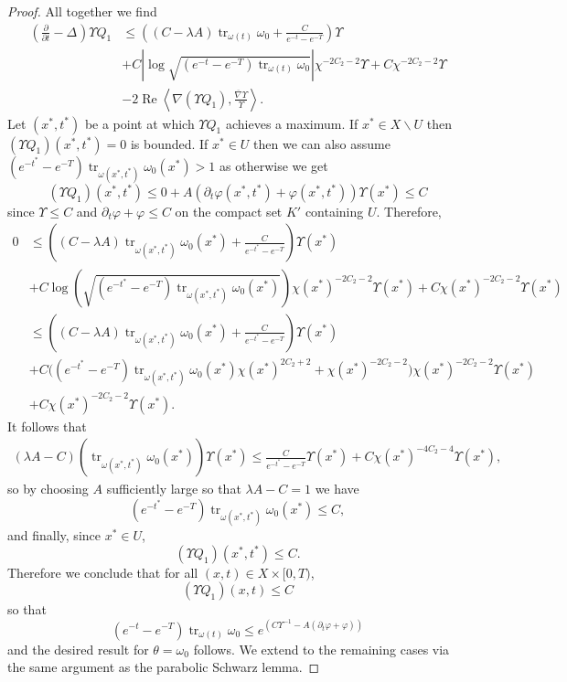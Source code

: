 \documentclass[12pt]{article}
\numberwithin{equation}{section}
\renewcommand{\d}{\partial}
\DeclareMathOperator{\tr}{tr}
\DeclareMathOperator{\Real}{Re}
\newcommand{\oo}[1]{\overline{#1}}
\newcommand{\parabolic}[1]{\left(\frac{\d}{\d t} - \Delta_{#1}\right)}
\newcommand{\ip}[1]{\left\langle#1\right\rangle}
\begin{document}
\begin{proof}
All together we find
\begin{align*}
    \parabolic{} \Upsilon Q_1 &\leq \left((C - \lambda A)\tr_{\omega(t)} \omega_0 + \frac{C}{e^{-t}-e^{-T}}\right) \Upsilon\\
    &+C \left|\log \sqrt{(e^{-t}-e^{-T})\tr_{\omega(t)} \omega_0} \right| \chi^{-2C_2-2}\Upsilon + C \chi^{-2C_2-2}\Upsilon\\
    &- 2 \Real \ip{\nabla (\Upsilon Q_1), \frac{\oo{\nabla} \Upsilon}{\Upsilon}}.
\end{align*}
Let $(x^*,t^*)$ be a point at which $\Upsilon Q_1$ achieves a maximum. If $x^* \in X \backslash U$ then $(\Upsilon Q_1)(x^*,t^*) =  0$ is bounded. If $x^* \in U$ then we can also assume $(e^{-t^*} - e^{-T}) \tr_{\omega(x^*,t^*)} \omega_0(x^*) > 1$ as otherwise we get
\begin{equation*}
    (\Upsilon Q_1)(x^*,t^*) \leq 0 + A(\d_t \varphi(x^*,t^*) + \varphi(x^*,t^*))\Upsilon(x^*) \leq C
\end{equation*}
since $\Upsilon \leq C$ and $\d_t \varphi + \varphi \leq C$ on the compact set $K'$ containing $U$. Therefore,
\begin{align*}
    0 &\leq \left((C - \lambda A)\tr_{\omega(x^*,t^*)} \omega_0(x^*) + \frac{C}{e^{-t^*}-e^{-T}}\right) \Upsilon(x^*)\\
    &+C \log \left(\sqrt{(e^{-t^*}-e^{-T})\tr_{\omega(x^*,t^*)} \omega_0(x^*)}\right) \chi(x^*)^{-2C_2-2}\Upsilon(x^*) + C \chi(x^*)^{-2C_2-2}\Upsilon(x^*)\\
    &\leq \left((C - \lambda A)\tr_{\omega(x^*,t^*)} \omega_0(x^*) + \frac{C}{e^{-t^*}-e^{-T}}\right) \Upsilon(x^*)\\
    &+C\Big( (e^{-t^*}-e^{-T})\tr_{\omega(x^*,t^*)} \omega_0(x^*) \chi(x^*)^{2C_2 + 2} + \chi(x^*)^{-2C_2-2} \Big) \chi(x^*)^{-2C_2-2}\Upsilon(x^*)\\
    &+ C \chi(x^*)^{-2C_2-2}\Upsilon(x^*).
\end{align*}
It follows that
\begin{align*}
    (\lambda A -C) \left(\tr_{\omega(x^*,t^*)} \omega_0(x^*)\right) \Upsilon(x^*) \leq \frac{C}{e^{-t^*}-e^{-T}} \Upsilon(x^*) + C\chi(x^*)^{-4C_2-4}\Upsilon(x^*),
\end{align*}
so by choosing $A$ sufficiently large so that $\lambda A - C = 1$ we have
\begin{equation*}
    (e^{-t^*}-e^{-T})\tr_{\omega(x^*,t^*)} \omega_0(x^*) \leq C,
\end{equation*}
and finally, since $x^* \in U$,
\begin{equation*}
    (\Upsilon Q_1)(x^*,t^*) \leq  C.
\end{equation*}
Therefore we conclude that for all $(x,t) \in X \times [0,T)$,
\begin{equation*}
    (\Upsilon Q_1)(x,t) \leq C
\end{equation*}
so that
\begin{equation*}
    (e^{-t}-e^{-T}) \tr_{\omega(t)} \omega_0 \leq e^{(C\Upsilon^{-1}-A(\d_t \varphi + \varphi))}
\end{equation*}
and the desired result for $\theta = \omega_0$ follows. We extend to the remaining cases via the same argument as the parabolic Schwarz lemma.
\end{proof}
\end{document}

